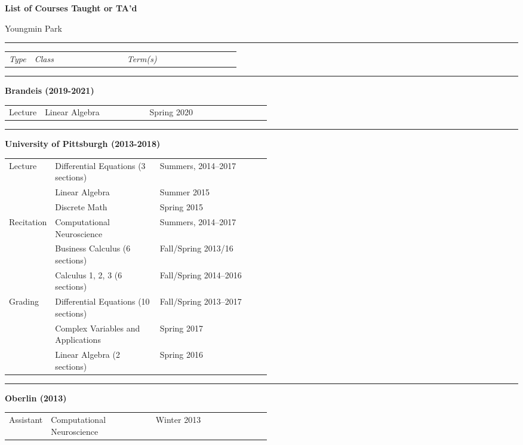\documentclass[a4paper,11pt]{article}
\begin{document}
\begin{center}
\Large \textbf{List of Courses Taught or TA'd}

\Large Youngmin Park
\end{center}


\noindent\rule{15cm}{0.4pt}

\begin{tabular}{p{0.11\linewidth}p{0.4\linewidth}p{.3\linewidth}}
	\textit{Type} & \textit{Class} & \textit{Term(s)}\\
\end{tabular}

\noindent\rule{15cm}{0.4pt}

\textbf{Brandeis (2019-2021)}

\begin{tabular}{p{0.11\linewidth}p{0.4\linewidth}p{.3\linewidth}}
	{Lecture} & Linear Algebra & Spring 2020
\end{tabular}

\noindent\rule{15cm}{0.4pt}

\textbf{University of Pittsburgh (2013-2018)}

\begin{tabular}{p{0.11\linewidth}p{0.4\linewidth}p{.3\linewidth}}
	Lecture & Differential Equations (3 sections) & Summers, 2014--2017\\
	& Linear Algebra & Summer 2015 \\
	& Discrete Math & Spring 2015 \\
	Recitation & Computational Neuroscience & Summers, 2014--2017 \\
	& Business Calculus (6 sections) & Fall/Spring 2013/16\\
	& Calculus 1, 2, 3 (6 sections) & Fall/Spring 2014--2016\\
	Grading & Differential Equations (10 sections) & Fall/Spring 2013--2017  \\
	& Complex Variables and Applications & Spring 2017 \\
	& Linear Algebra (2 sections) & Spring 2016
\end{tabular}

\noindent\rule{15cm}{0.4pt}

\textbf{Oberlin (2013)}

\begin{tabular}{p{0.11\linewidth}p{0.4\linewidth}p{.2\linewidth}}
	Assistant & Computational Neuroscience  & Winter 2013 
\end{tabular}
\end{document}
